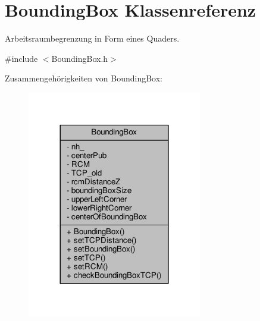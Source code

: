 \hypertarget{classBoundingBox}{\section{Bounding\-Box Klassenreferenz}
\label{classBoundingBox}
}


Arbeitsraumbegrenzung in Form eines Quaders.  




{\ttfamily \#include $<$Bounding\-Box.\-h$>$}



Zusammengehörigkeiten von Bounding\-Box\-:
\nopagebreak
\begin{figure}[H]
\begin{center}
\leavevmode
\includegraphics[width=216pt]{classBoundingBox__coll__graph}
\end{center}
\end{figure}
